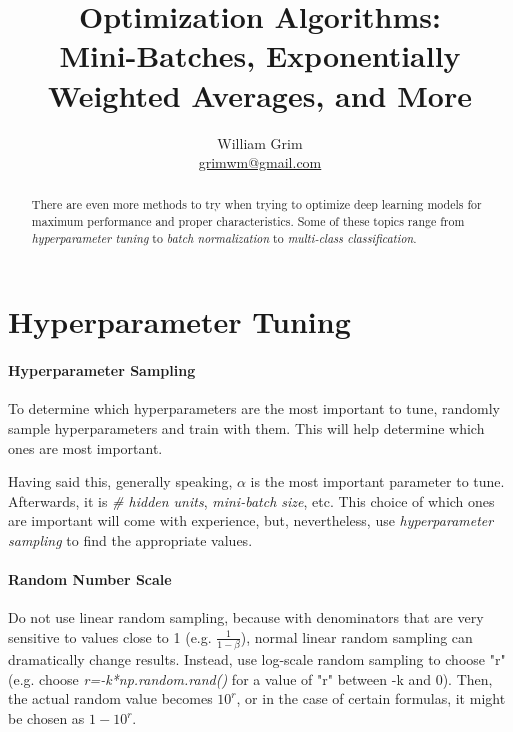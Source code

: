 \documentclass{article}
\begin{document}
\title {Optimization Algorithms:\\
Mini-Batches, Exponentially Weighted Averages, and More}
\author{William Grim \\ \href{mailto:grimwm@gmail.com}{grimwm@gmail.com}}

\maketitle

\tableofcontents

\begin{abstract}
There are even more methods to try when trying to optimize deep learning models for maximum performance and proper characteristics.  Some of these topics range from \textit{hyperparameter tuning} to \textit{batch normalization} to \textit{multi-class classification}.
\end{abstract}

\section{Hyperparameter Tuning}

\paragraph{Hyperparameter Sampling}

To determine which hyperparameters are the most important to tune, randomly sample hyperparameters and train with them.  This will help determine which ones are most important.

Having said this, generally speaking, $\alpha$ is the most important parameter to tune.  Afterwards, it is \textit{\# hidden units}, \textit{mini-batch size}, etc.  This choice of which ones are important will come with experience, but, nevertheless, use \textit{hyperparameter sampling} to find the appropriate values.

\paragraph{Random Number Scale}

Do not use linear random sampling, because with denominators that are very sensitive to values close to 1 (e.g. $\frac{1}{1-\beta}$), normal linear random sampling can dramatically change results.  Instead, use log-scale random sampling to choose "r" (e.g. choose \textit{r=-k*np.random.rand()} for a value of "r" between -k and 0).  Then, the actual random value becomes $10^r$, or in the case of certain formulas, it might be chosen as $1 - 10^r$.
\end{document}
